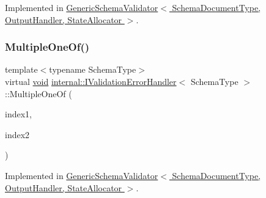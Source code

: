 Implemented in \hyperlink{classGenericSchemaValidator_a557b7aa531ff94a6355fed8f8575fed5}{Generic\+Schema\+Validator$<$ Schema\+Document\+Type, Output\+Handler, State\+Allocator $>$}.

\mbox{\label{classinternal_1_1IValidationErrorHandler_aea207ebba88ff7d198b55b04f0ff43e0}} 
\subsubsection{\texorpdfstring{Multiple\+One\+Of()}{MultipleOneOf()}}
{\footnotesize\ttfamily template$<$typename Schema\+Type$>$ \\
virtual \hyperlink{imgui__impl__opengl3__loader_8h_ac668e7cffd9e2e9cfee428b9b2f34fa7}{void} \hyperlink{classinternal_1_1IValidationErrorHandler}{internal\+::\+I\+Validation\+Error\+Handler}$<$ Schema\+Type $>$\+::Multiple\+One\+Of (\begin{DoxyParamCaption}\item[{\hyperlink{rapidjson_8h_a5ed6e6e67250fadbd041127e6386dcb5}{Size\+Type}}]{index1,  }\item[{\hyperlink{rapidjson_8h_a5ed6e6e67250fadbd041127e6386dcb5}{Size\+Type}}]{index2 }\end{DoxyParamCaption})\hspace{0.3cm}{\ttfamily [pure virtual]}}



Implemented in \hyperlink{classGenericSchemaValidator_a53c37b0dba5f2ca79d2c7c13488e5ffd}{Generic\+Schema\+Validator$<$ Schema\+Document\+Type, Output\+Handler, State\+Allocator $>$}.

\mbox{\label{classinternal_1_1IValidationErrorHandler_a70105117617fc7edbe7f032975888e13}} 
